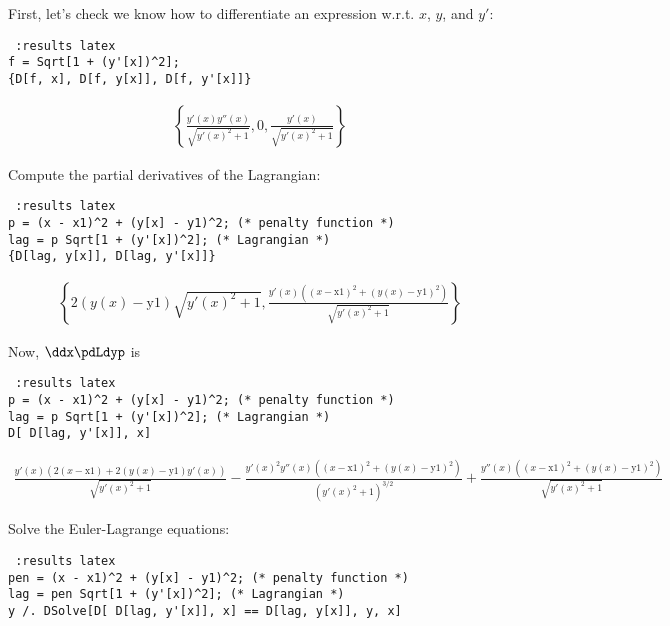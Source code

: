 First, let's check we know how to differentiate an expression w.r.t. $x$, $y$, and $y'$:

\begin{verbatim} :results latex
f = Sqrt[1 + (y'[x])^2];
{D[f, x], D[f, y[x]], D[f, y'[x]]}
\end{verbatim}
\begin{align*}
\left\{\frac{y'(x) y''(x)}{\sqrt{y'(x)^2+1}},0,\frac{y'(x)}{\sqrt{y'(x)^2+1}}\right\}
\end{align*}

Compute the partial derivatives of the Lagrangian:

\begin{verbatim} :results latex
p = (x - x1)^2 + (y[x] - y1)^2; (* penalty function *)
lag = p Sqrt[1 + (y'[x])^2]; (* Lagrangian *)
{D[lag, y[x]], D[lag, y'[x]]}
\end{verbatim}

\begin{align*}
\left\{2 (y(x)-\text{y1}) \sqrt{y'(x)^2+1},\frac{y'(x) \left((x-\text{x1})^2+(y(x)-\text{y1})^2\right)}{\sqrt{y'(x)^2+1}}\right\}
\end{align*}


Now, $\ddx \pdLdyp$ is

\begin{verbatim} :results latex
p = (x - x1)^2 + (y[x] - y1)^2; (* penalty function *)
lag = p Sqrt[1 + (y'[x])^2]; (* Lagrangian *)
D[ D[lag, y'[x]], x]
\end{verbatim}

\begin{align*}
\frac{y'(x) \left(2 (x-\text{x1})+2 (y(x)-\text{y1}) y'(x)\right)}{\sqrt{y'(x)^2+1}}-\frac{y'(x)^2 y''(x) \left((x-\text{x1})^2+(y(x)-\text{y1})^2\right)}{\left(y'(x)^2+1\right)^{3/2}}+\frac{y''(x) \left((x-\text{x1})^2+(y(x)-\text{y1})^2\right)}{\sqrt{y'(x)^2+1}}
\end{align*}


Solve the Euler-Lagrange equations:

\begin{verbatim} :results latex
pen = (x - x1)^2 + (y[x] - y1)^2; (* penalty function *)
lag = pen Sqrt[1 + (y'[x])^2]; (* Lagrangian *)
y /. DSolve[D[ D[lag, y'[x]], x] == D[lag, y[x]], y, x]
\end{verbatim}

